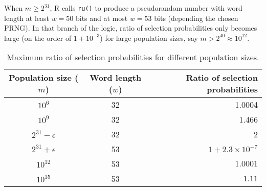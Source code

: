 \documentclass[12pt]{article}
\begin{document}
When $m \ge 2^{31}$, R calls \texttt{ru()}  to produce a pseudorandom number with word length at least $w=50$ bits and at most $w=53$ bits (depending the chosen PRNG). 
In that branch of the logic, ratio of selection probabilities only becomes large (on the order of $1+10^{-3}$) for large population sizes, say $m > 2^{40} \approx 10^{12}$. 

\begin{table}[h]
\caption{Maximum ratio of selection probabilities for different population sizes.}
\begin{center}
\begin{tabular}{|c|c|r|}


Population size ($m$) & Word length ($w$) & Ratio of selection probabilities\\
\hline 
$10^6$ & 32 & 1.0004 \\
$10^9$ & 32 & 1.466 \\
 $2^{31}-\epsilon$ & 32 & 2 \\
$2^{31}+\epsilon$ & 53 & $1 + 2.3 \times 10^{-7}$ \\
$10^{12}$ & 53 & $1.0001$ \\
$10^{15}$ & 53 & $1.11$ \\

\end{tabular}
\end{center}
\label{tab}
\end{table}%




\end{document}
